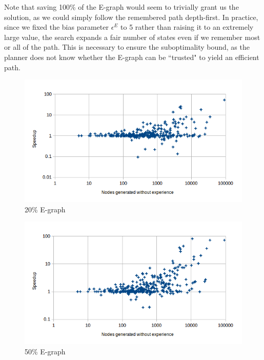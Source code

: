 \documentclass[letterpaper]{article}
\begin{document}
Note that saving 100\% of the E-graph would seem to trivially grant us the solution, as we could simply follow the remembered path depth-first.
In practice, since we fixed the bias parameter $\epsilon^E$ to 5 rather than raising it to an extremely large value, the search expands a fair number of states even if we remember most or all of the path.
This is necessary to ensure the suboptimality bound, as the planner does not know whether the E-graph can be ``trusted" to yield an efficient path.

\begin{figure}
	\begin{center}
	\includegraphics[scale=0.5]{Speedup_20_0.png}
	\end{center}
	\caption{20\% E-graph}
	 \label{fig:s_20_0}
\end{figure}

\begin{figure}
	\begin{center}
	\includegraphics[scale=0.5]{Speedup_50_0.png}
	\end{center}
	\caption{50\% E-graph}
	 \label{fig:s_50_0}
\end{figure}
\end{document}
